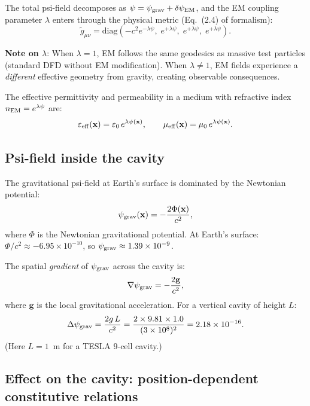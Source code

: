 \documentclass[11pt]{article}
\newcommand{\lam}{\lambda}
\newcommand{\ee}[1]{\times 10^{#1}}
\newcommand{\psigrav}{\psi_{\rm grav}}
\newcommand{\dpsiEM}{\delta\psi_{\rm EM}}
\theoremstyle{definition}
\theoremstyle{remark}
\begin{document}
The total psi-field decomposes as $\psi = \psigrav + \dpsiEM$, and
the EM coupling parameter $\lam$ enters through the physical metric
(Eq.~(2.4) of formalism):
\begin{equation}
\tilde{g}_{\mu\nu} = \text{diag}\!\left(-c^2 e^{-\lam\psi},\;
e^{+\lam\psi},\; e^{+\lam\psi},\; e^{+\lam\psi}\right).
\label{eq:physical_metric_lambda}
\end{equation}

\textbf{Note on $\lam$}: When $\lam = 1$, EM follows the same geodesics
as massive test particles (standard DFD without EM modification).
When $\lam \neq 1$, EM fields experience a \emph{different} effective
geometry from gravity, creating observable consequences.

The effective permittivity and permeability in a medium with refractive
index $n_{\rm EM} = e^{\lam\psi}$ are:
\begin{equation}
\varepsilon_{\rm eff}(\mathbf{x}) = \varepsilon_0\,e^{\lam\psi(\mathbf{x})},
\qquad
\mu_{\rm eff}(\mathbf{x}) = \mu_0\,e^{\lam\psi(\mathbf{x})}.
\label{eq:constitutive}
\end{equation}


\subsection{Psi-field inside the cavity}

The gravitational psi-field at Earth's surface is dominated by the
Newtonian potential:
\begin{equation}
\psigrav(\mathbf{x}) = -\frac{2\Phi(\mathbf{x})}{c^2},
\label{eq:psi_grav}
\end{equation}
where $\Phi$ is the Newtonian gravitational potential. At Earth's
surface: $\Phi/c^2 \approx -6.95\ee{-10}$, so $\psigrav \approx
1.39\ee{-9}$.

The spatial \emph{gradient} of $\psigrav$ across the cavity is:
\begin{equation}
\nabla\psigrav = -\frac{2\mathbf{g}}{c^2},
\label{eq:grad_psi}
\end{equation}
where $\mathbf{g}$ is the local gravitational acceleration. For a
vertical cavity of height $L$:
\begin{equation}
\Delta\psigrav = \frac{2g\,L}{c^2}
= \frac{2\times 9.81\times 1.0}{(3\ee{8})^2}
= 2.18\ee{-16}.
\label{eq:delta_psi_cavity}
\end{equation}
(Here $L = 1$~m for a TESLA 9-cell cavity.)


\subsection{Effect on the cavity: position-dependent constitutive relations}
\end{document}
